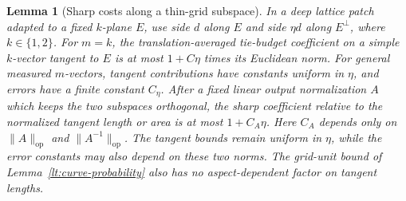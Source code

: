 \documentclass[11pt]{article}
\numberwithin{equation}{section}
\newtheorem{lemma}[theorem]{Lemma}
\theoremstyle{definition}
\theoremstyle{remark}
\newcommand{\op}{\mathrm{op}}
\begin{document}
\begin{lemma}[Sharp costs along a thin-grid subspace]
\label{lt:sharp-grid}
In a deep lattice patch adapted to a fixed $k$-plane $E$, use side
$d$ along $E$ and side $\eta d$ along $E^\perp$, where
$k\in\{1,2\}$.  For $m=k$, the translation-averaged tie-budget
coefficient on a simple $k$-vector tangent to $E$ is at most
$1+C\eta$ times its Euclidean norm.  For general measured
$m$-vectors, tangent contributions have constants uniform in
$\eta$, and errors have a finite constant $C_\eta$.
After a fixed linear output normalization $A$ which keeps the two
subspaces orthogonal, the sharp coefficient relative to the normalized
tangent length or area is at most $1+C_A\eta$. Here $C_A$ depends only on
$\|A\|_{\op}$ and $\|A^{-1}\|_{\op}$. The tangent bounds remain
uniform in $\eta$, while the error constants may also depend on these
two norms.
The grid-unit bound of Lemma~\ref{lt:curve-probability} also has no
aspect-dependent factor on tangent lengths.
\end{lemma}
\end{document}
